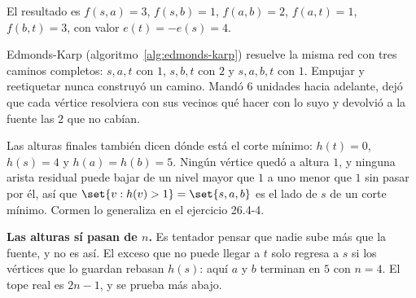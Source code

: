 \documentclass[11pt,letterpaper]{article}
\begin{document}
\begin{ejemplo}
\begin{center}
  \end{center}
  El resultado es $f(s, a) = 3$, $f(s, b) = 1$, $f(a, b) = 2$,
  $f(a, t) = 1$, $f(b, t) = 3$, con valor $e(t) = -e(s) = 4$.
\end{ejemplo}

Edmonds-Karp (algoritmo~\ref{alg:edmonds-karp}) resuelve la misma red
con tres caminos completos: $s, a, t$ con $1$, $s, b, t$ con $2$ y
$s, a, b, t$ con $1$. Empujar y reetiquetar nunca construyó un camino.
Mandó $6$ unidades hacia adelante, dejó que cada vértice resolviera
con sus vecinos qué hacer con lo suyo y devolvió a la fuente las $2$
que no cabían.

Las alturas finales también dicen dónde está el corte mínimo:
$h(t) = 0$, $h(s) = 4$ y $h(a) = h(b) = 5$. Ningún vértice quedó a
altura $1$, y ninguna arista residual puede bajar de un nivel mayor
que $1$ a uno menor que $1$ sin pasar por él, así que
$\set{v : h(v) > 1} = \set{s, a, b}$ es el lado de $s$ de un corte
mínimo. Cormen lo generaliza en el ejercicio 26.4-4.

\begin{ojo}
  \textbf{Las alturas sí pasan de $n$.} Es tentador pensar que nadie
  sube más que la fuente, y no es así. El exceso que no puede llegar a
  $t$ solo regresa a $s$ si los vértices que lo guardan rebasan $h(s)$:
  aquí $a$ y $b$ terminan en $5$ con $n = 4$. El tope real es
  $2n - 1$, y se prueba más abajo.
\end{ojo}
\end{document}
